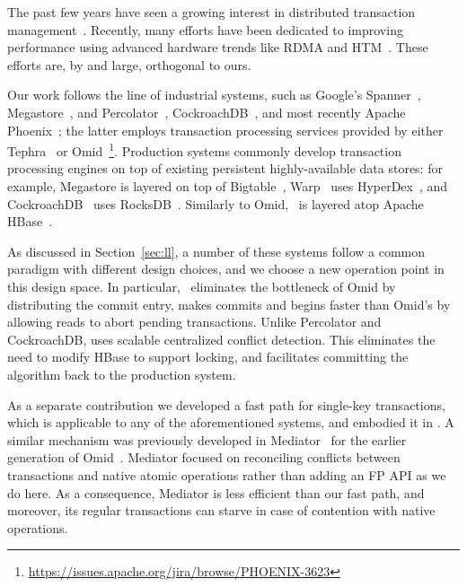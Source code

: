 

The past few years have seen a growing interest in distributed 
transaction management~\cite{PattersonENAA12,Cowling2012,Aguilera2015,Balakrishnan2013,Thomson2012,eyal2013ordering,Warp}.
Recently, many efforts have been dedicated to improving performance using advanced 
hardware trends like RDMA and HTM~\cite{Wei2015,Dragojevic2014,Dragojevic2015}.  
These efforts are, by and large, orthogonal to ours.

Our work follows the line of industrial systems, such as 
Google's Spanner~\cite{Spanner2012}, Megastore~\cite{Megastore}, and Percolator~\cite{Percolator2010}, 
CockroachDB~\cite{cockroach}, and most recently Apache Phoenix~\cite{phoenix}; 
the latter employs 
transaction processing services provided by either Tephra~\cite{tephra} or Omid~\cite{Omid2017}\footnote{\url{https://issues.apache.org/jira/browse/PHOENIX-3623}}. 
Production systems commonly develop transaction processing engines on top of existing persistent 
highly-available data stores: for example, Megastore is layered on top of
Bigtable~\cite{Chang2008}, Warp~\cite{Warp} uses HyperDex~\cite{Escriva2012}, 
and CockroachDB~\cite{cockroach} uses RocksDB~\cite{rocksdb}.
Similarly to Omid, \sys\ is layered atop Apache HBase~\cite{hbase}.

As discussed in Section~\ref{sec:ll}, a number of these systems follow a common paradigm
with different design choices, and we choose a new operation point in 
this design space. In particular, \sysll\ eliminates the bottleneck of Omid by
distributing the commit entry, makes commits and begins faster than Omid's by 
allowing reads to abort pending transactions. Unlike Percolator and CockroachDB, 
\sysll\/ uses scalable centralized conflict detection. This eliminates the need to modify 
HBase to support locking, and facilitates committing the algorithm back 
to the production system. 



As a separate contribution we developed a fast path for single-key transactions,
which is applicable to any of the aforementioned systems, and embodied it in \sys. A similar mechanism 
was previously developed in Mediator~\cite{mediator} for the earlier generation 
of Omid~\cite{OmidICDE2014}. Mediator focused on reconciling conflicts between 
transactions and native atomic operations rather than adding an FP API as we do here. 
As a consequence, Mediator is less efficient than our fast path, and moreover, 
its regular transactions can starve in case 
of contention with native operations. 


